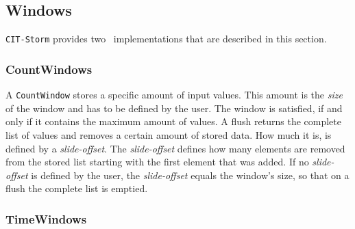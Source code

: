 \subsection{Windows}
\label{sect:windows}
\texttt{CIT-Storm} provides two \iwindow\ implementations that are described in this section.

\subsubsection{CountWindows}
A \texttt{CountWindow} stores a specific amount of input values. This amount is the \textsl{size} of the window and has to be defined by the user. The window is satisfied, if and only if it contains the maximum amount of values. A flush returns the complete list of values and removes a certain amount of stored data. How much it is, is defined by a \textsl{slide-offset}. The \textsl{slide-offset} defines how many elements are removed from the stored list starting with the first element that was added. If no \textsl{slide-offset} is defined by the user, the \textsl{slide-offset} equals the window's size, so that on a flush the complete list is emptied.

\subsubsection{TimeWindows}
\label{sect:Timewindow}